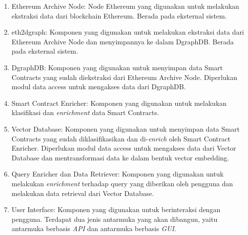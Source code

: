 \begin{enumerate}
	\item Ethereum Archive Node: Node Ethereum yang digunakan untuk melakukan ekstraksi data dari blockchain Ethereum. Berada pada eksternal sistem.
	\item eth2dgraph: Komponen yang digunakan untuk melakukan ekstraksi data dari Ethereum Archive Node dan menyimpannya ke dalam DgraphDB. Berada pada eksternal sistem.
	\item DgraphDB: Komponen yang digunakan untuk menyimpan data Smart Contracts yang sudah diekstraksi dari Ethereum Archive Node. Diperlukan modul data access untuk mengakses data dari DgraphDB.
	\item Smart Contract Enricher: Komponen yang digunakan untuk melakukan klasifikasi dan \textit{enrichment} data Smart Contracts.
	\item Vector Database: Komponen yang digunakan untuk menyimpan data Smart Contracts yang sudah diklasifikasikan dan di-\textit{enrich} oleh Smart Contract Enricher. Diperlukan modul data access untuk mengakses data dari Vector Database dan mentransformasi data ke dalam bentuk vector embedding.
	\item Query Enricher dan Data Retriever: Komponen yang digunakan untuk melakukan \textit{enrichment} terhadap query yang diberikan oleh pengguna dan melakukan data retrieval dari Vector Database.
	\item User Interface: Komponen yang digunakan untuk berinteraksi dengan pengguna. Terdapat dua jenis antarmuka yang akan dibangun, yaitu antarmuka berbasis \textit{API} dan antarmuka berbasis \textit{GUI}.
\end{enumerate}







